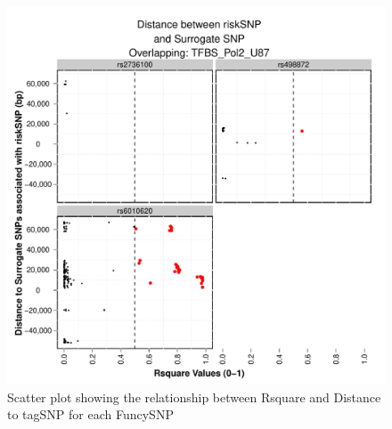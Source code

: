 \documentclass[a4paper]{article}
\begin{document}
\begin{figure}[ht!]
\begin{center}
\includegraphics{FunciSNP.0.1.7/plots/TFBS_Pol2_U87_R2vsDist_riskSNP.pdf}
\caption{\label{fig:TFBS_Pol2_U87_R2vsDist_riskSNP.pdf} Scatter plot 
showing the relationship between Rsquare and Distance to tagSNP for each 
FuncySNP}
{\footnotesize{}}
\end{center}
\end{figure}
\end{document}
